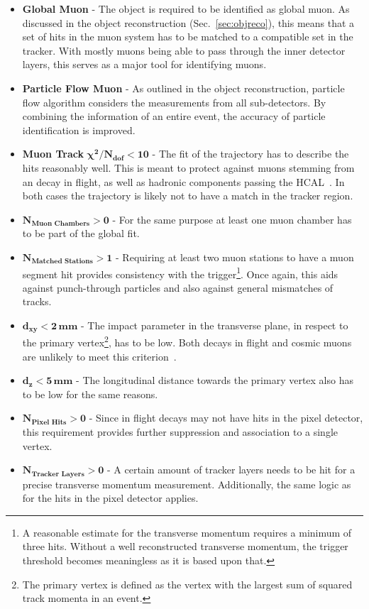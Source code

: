 \begin{itemize}
\item \textbf{Global Muon} - The object is required to be identified as global muon. As discussed in the object reconstruction (Sec.~\ref{sec:objreco}), this means that a set of hits in the muon system has to be matched to a compatible set in the tracker. With mostly muons being able to pass through the inner detector layers, this serves as a major tool for identifying muons.
\item \textbf{Particle Flow Muon} - As outlined in the object reconstruction, particle flow algorithm considers the measurements from all sub-detectors. By combining the information of an entire event, the accuracy of particle identification is improved.
\item \textbf{Muon Track} $\mathbf{\chi^2 / N_{\textbf{dof}} < 10}$ - The fit of the trajectory has to describe the hits reasonably well. This is meant to protect against muons stemming from an decay in flight, as well as hadronic components passing the HCAL~\cite{muonidcosmic}. In both cases the trajectory is likely not to have a match in the tracker region.
\item $\mathbf{N_{\textbf{Muon Chambers}} > 0}$ - For the same purpose at least one muon chamber has to be part of the global fit. 
\item $\mathbf{N_{\textbf{Matched Stations}} > 1}$ - Requiring at least two muon stations to have a muon segment hit provides consistency with the trigger\footnote{A reasonable estimate for the transverse momentum requires a minimum of three hits. Without a well reconstructed transverse momentum, the trigger threshold becomes meaningless as it is based upon that.}. Once again, this aids against punch-through particles and also against general mismatches of tracks.
\item $\mathbf{d_{xy} < 2\,\textbf{mm}}$ - The impact parameter in the transverse plane, in respect to the primary vertex\footnote{The primary vertex is defined as the vertex with the largest sum of squared track momenta in an event.}, has to be low. Both decays in flight and cosmic muons are unlikely to meet this criterion~\cite{muonidcosmic}.
\item $\mathbf{d_z < 5\,\textbf{mm}}$ - The longitudinal distance towards the primary vertex also has to be low for the same reasons.
\item $\mathbf{N_{\textbf{Pixel Hits}} > 0}$ - Since in flight decays may not have hits in the pixel detector, this requirement provides further suppression and association to a single vertex.
\item $\mathbf{N_{\textbf{Tracker Layers}} > 0}$ - A certain amount of tracker layers needs to be hit for a precise transverse momentum measurement. Additionally, the same logic as for the hits in the pixel detector applies.
\end{itemize}

